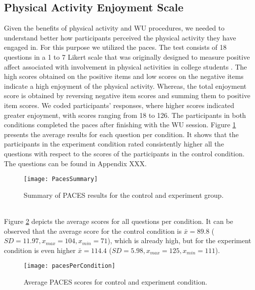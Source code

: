 \subsection{Physical Activity Enjoyment Scale}
Given the benefits of physical activity and WU procedures, we needed to understand better how participants perceived the physical activity they have engaged in. For this purpose we utilized the \acrfull{paces}. The test consists of 18 questions in a 1 to 7 Likert scale that was originally designed to measure positive affect associated with involvement in physical activities in college students \cite{kendzierski1991physical}.  The high scores obtained on the positive items and low scores on the negative items indicate a high enjoyment of the physical activity. Whereas, the total enjoyment score is obtained by reversing negative item scores and summing them to positive item scores. We coded participants' responses, where higher scores indicated greater enjoyment, with scores ranging from 18 to 126. The participants in both conditions completed the \gls{paces} after finishing with the WU session. Figure \ref{fig:pacees} presents the average results for each question per condition. It shows that the participants in the experiment condition rated consistently higher all the questions with respect to the scores of the participants in the control condition. The questions can be found in Appendix XXX.\\
\begin{figure}[h]
    \centering
    \texttt{[image: PacesSummary]}
    \caption{Summary of PACES results for the control and experiment group.}
    \label{fig:pacees}
\end{figure}\\
Figure \ref{fig:pacesPerCondition} depicts the average scores for all questions per condition. It can be observed that the average score for the control condition is \begin{math}\bar{x} = 89.8 \end{math} (\begin{math} SD = 11.97, x_{max}= 104, x_{min}= 71\end{math}), which is already high, but for the experiment condition is even higher  \begin{math}\bar{x} = 114.4 \end{math} (\begin{math} SD = 5.98, x_{max}= 125, x_{min}= 111\end{math}).\\
\begin{figure}[h]
    \centering
    \texttt{[image: pacesPerCondition]}
    \caption{Average PACES scores for control and experiment condition.}
\label{fig:pacesPerCondition}
\end{figure}\\
